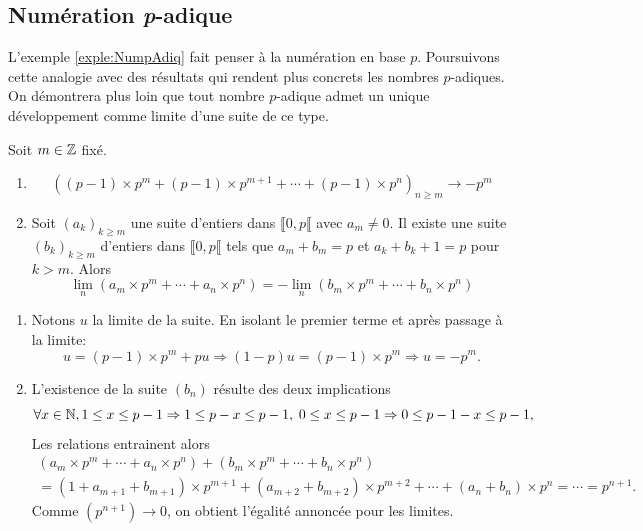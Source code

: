 \subsection{Numération \emph{p}-adique}
L'exemple \ref{exple:NumpAdiq} fait penser à la numération en base $p$. Poursuivons cette analogie avec des résultats qui rendent plus concrets les nombres $p$-adiques. On démontrera plus loin que tout nombre $p$-adique admet un unique développement comme limite d'une suite de ce type.
\begin{prop}
Soit $m \in \mathbb{Z}$ fixé.
 \begin{enumerate}
  \item
  \begin{displaymath}
   \left( (p-1)\times p^m + (p-1)\times p^{m+1} + \cdots + (p-1)\times p^{n}\right)_{n\geq m} \rightarrow - p^m
  \end{displaymath}
  \item Soit $(a_k)_{k\geq m}$ une suite d'entiers dans $\llbracket 0, p \llbracket$ avec $a_m \neq 0$. Il existe une suite $(b_k)_{k\geq m}$ d'entiers dans $\llbracket 0, p \llbracket$ tels que $a_m + b_m =p$ et $a_k + b_k + 1 =p$ pour $k>m$. Alors
  \begin{displaymath}
   \lim_n \left( a_m\times p^m + \cdots + a_n\times p^n \right) = -\lim_n \left( b_m\times p^m + \cdots + b_n\times p^n \right)
  \end{displaymath}
 \end{enumerate}
\end{prop}
\begin{demo}
 \begin{enumerate}
  \item Notons $u$ la limite de la suite. En isolant le premier terme et après passage à la limite:
  \begin{displaymath}
   u = (p-1) \times p^m + p u\Rightarrow (1-p)u = (p-1)\times p^m \Rightarrow u = -p^m.
  \end{displaymath}
  \item L'existence de la suite $(b_n)$ résulte des deux implications
  \begin{displaymath}
   \forall x \in \mathbb{N}, 1 \leq x \leq p- 1  \Rightarrow 1\leq p - x \leq p -1, \; 0 \leq x \leq p- 1  \Rightarrow 0\leq p - 1 -x \leq p -1,
  \end{displaymath}
Les relations entrainent alors
\begin{multline*}
 (a_m \times p^m + \cdots + a_n\times p^n) + (b_m \times p^m + \cdots + b_n\times p^n) \\
   = (1 + a_{m+1} + b_{m+1})\times p^{m+1} + (a_{m+2} + b_{m+2})\times p^{m+2} + \cdots + (a_{n} + b_{n})\times p^{n}
   = \cdots
   = p^{n+1}.
\end{multline*}
Comme $(p^{n+1}) \rightarrow 0$, on obtient l'égalité annoncée pour les limites.
 \end{enumerate}
\end{demo}


